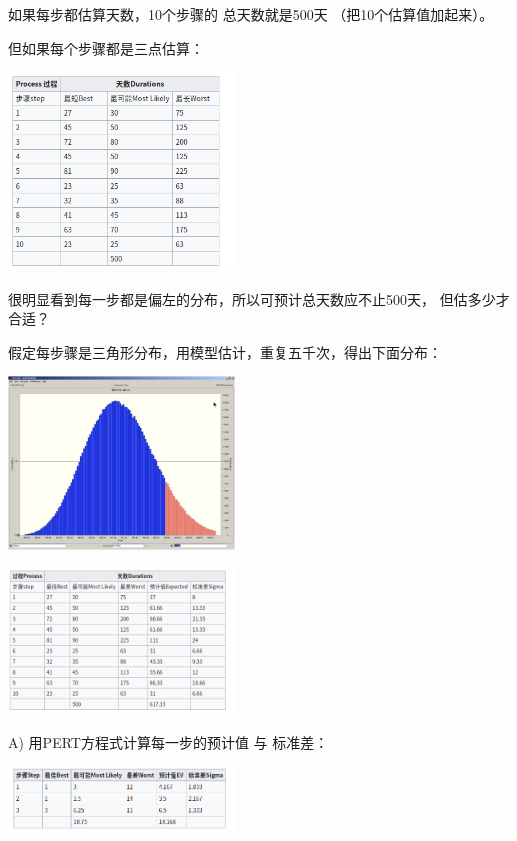 如果每步都估算天数，10个步骤的 总天数就是500天 （把10个估算值加起来）。

但如果每个步骤都是三点估算：


\includegraphics[width=6cm]{Screenshotfrom2023-11-1403-10-17.png}

很明显看到每一步都是偏左的分布，所以可预计总天数应不止500天，
但估多少才合适？

假定每步骤是三角形分布，用模型估计，重复五千次，得出下面分布：


\includegraphics[width=6cm]{HMTT_v13_s77.png}


\includegraphics[width=6cm]{Screenshotfrom2023-11-1403-10-57.png}

A) 用PERT方程式计算每一步的预计值 与 标准差：


\includegraphics[width=6cm]{Screenshotfrom2023-11-1403-12-52.png}

